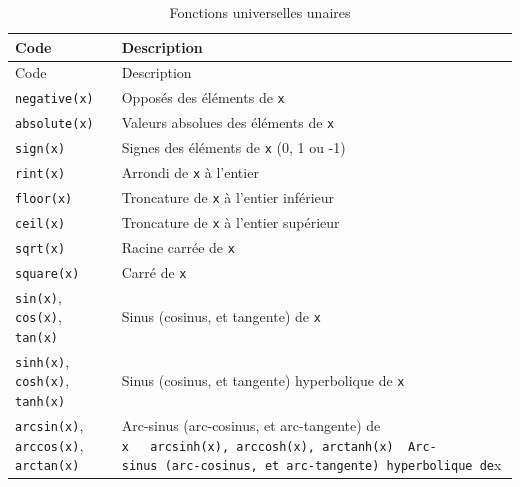 \documentclass[
  12pt,
]{book}
\numberwithin{equation}{section}
\numberwithin{countremarque}{section}
\begin{document}
\begin{longtable}[]{@{}
  >{\raggedleft\arraybackslash}p{}
  >{\raggedleft\arraybackslash}p{}@{}}
\caption{\label{tab:ufuncs-unaires} Fonctions universelles unaires}\tabularnewline
\toprule\noalign{}
\begin{minipage}[b]{\linewidth}\raggedleft
Code
\end{minipage} & \begin{minipage}[b]{\linewidth}\raggedleft
Description
\end{minipage} \\
\midrule\noalign{}
\endfirsthead
\toprule\noalign{}
\begin{minipage}[b]{\linewidth}\raggedleft
Code
\end{minipage} & \begin{minipage}[b]{\linewidth}\raggedleft
Description
\end{minipage} \\
\midrule\noalign{}
\endhead
\bottomrule\noalign{}
\endlastfoot
\texttt{negative(x)} & Opposés des éléments de \texttt{x} \\
\texttt{absolute(x)} & Valeurs absolues des éléments de \texttt{x} \\
\texttt{sign(x)} & Signes des éléments de \texttt{x} (0, 1 ou -1) \\
\texttt{rint(x)} & Arrondi de \texttt{x} à l'entier \\
\texttt{floor(x)} & Troncature de \texttt{x} à l'entier inférieur \\
\texttt{ceil(x)} & Troncature de \texttt{x} à l'entier supérieur \\
\texttt{sqrt(x)} & Racine carrée de \texttt{x} \\
\texttt{square(x)} & Carré de \texttt{x} \\
\texttt{sin(x)}, \texttt{cos(x)}, \texttt{tan(x)} & Sinus (cosinus, et tangente) de \texttt{x} \\
\texttt{sinh(x)}, \texttt{cosh(x)}, \texttt{tanh(x)} & Sinus (cosinus, et tangente) hyperbolique de \texttt{x} \\
\texttt{arcsin(x)}, \texttt{arccos(x)}, \texttt{arctan(x)} & Arc-sinus (arc-cosinus, et arc-tangente) de \texttt{x\ \textbar{}\ \textbar{}\ \textasciigrave{}arcsinh(x)\textasciigrave{},\ \textasciigrave{}arccosh(x)\textasciigrave{},\ \textasciigrave{}arctanh(x)\textasciigrave{}\ \textbar{}\ Arc-sinus\ (arc-cosinus,\ et\ arc-tangente)\ hyperbolique\ de}x \\

\end{longtable}
\end{document}
